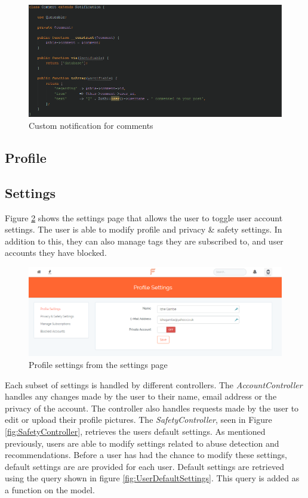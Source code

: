 \begin{figure}[H]
\centering
\includegraphics[width=\textwidth]{Images/Implementation/CommentNotification}
\caption{Custom notification for comments}
\label{fig:CommentNotification}
\end{figure}

\subsection{Profile}
\subsection{Settings}
Figure \ref{fig:SettingsImplementation} shows the settings page that allows the user to toggle user account settings. The user is able to modify profile and privacy \& safety settings. In addition to this, they can also manage tags they are subscribed to, and user accounts they have blocked.

\begin{figure}[H]
\centering
\includegraphics[width=\textwidth]{Images/Implementation/SettingsPage}
\caption{Profile settings from the settings page}
\label{fig:SettingsImplementation}
\end{figure}

Each subset of settings is handled by different controllers. The \textit{AccountController} handles any changes made by the user to their name, email address or the privacy of the account. The controller also handles requests made by the user to edit or upload their profile pictures. The \textit{SafetyController}, seen in Figure \ref{fig:SafetyController}, retrieves the users default settings. As mentioned previously, users are able to modify settings related to abuse detection and recommendations. Before a user has had the chance to modify these settings, default settings are are provided for each user. Default settings are retrieved using the query shown in figure \ref{fig:UserDefaultSettings}. This query is added as a function on the model.


